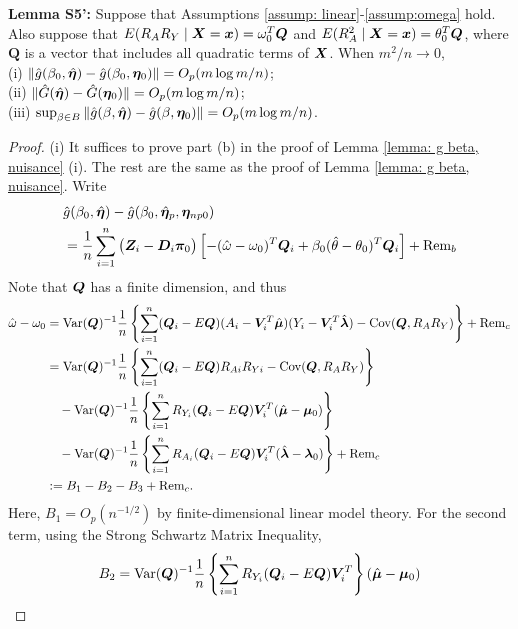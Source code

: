 \documentclass[12pt]{article}
\begin{document}
{{{\bf Lemma S5':}
Suppose that Assumptions \ref{assump: linear}-\ref{assump:omega} hold. Also suppose that  $E(R_A R_Y\mid \bm{X} = \bm x ) = \omega_0^T \bm Q $ and $E(R_A^2 \mid \bm{X} = \bm x ) = \theta_0^T \bm Q $, where $\bm Q$ is a vector that includes all quadratic terms of $\bm{X}$. When $ m^2/n\rightarrow 0 $, \\
(i)  $\|\hat g(\beta_0, \hat{\bm \eta}) -\hat g(\beta_0, \bm \eta_0) \|=O_p(m\log m/n)$;\\
(ii) $\| \hat G(\hat {\bm \eta}) -  \hat G( \bm \eta_0)\|=  O_p(m\log m/n)$;\\
(iii) $\sup_{\beta\in B} \|\hat g(\beta, \hat{\bm \eta}) -\hat g(\beta, \bm \eta_0) \|=  O_p(m\log m/n)$.

\begin{proof}
(i)	It suffices to prove part (b) in the proof of Lemma \ref{lemma: g beta, nuisance} (i). The rest are the same as the proof of Lemma \ref{lemma: g beta, nuisance}. Write
	\begin{align*}
		& \hat g(\beta_0,  \hat {\bm \eta}) - \hat 	g( \beta_0, \hat {\bm \eta}_{p},  \bm \eta_{np0})  \\
		&= \frac{1}{n} \sum_{i=1}^{n}    \big( \bm{Z}_i-\bm D_i \bm\pi_0 \big)  \left[ - (\hat\omega - \omega_0)^T \bm Q_i + \beta_0 (\hat\theta -\theta_0 )^T  \bm Q_i  \right] +\text{Rem}_b
	\end{align*}  
Note that $\bm Q$ has a finite dimension, and thus 
\begin{align*}
	\hat \omega - \omega_0 & = \mbox{Var} (\bm Q)^{-1} \frac1n \left\{\sum_{i=1}^n (\bm Q_i - E \bm Q) (A_i - \bm{V}_i^T \hat{\bm\mu}) (Y_i - \bm{V}_i^T \hat{\bm\lambda}) -  \mbox{Cov} (\bm Q, R_AR_Y ) \right\} + \text{Rem}_c \\
	&= \mbox{Var} (\bm Q)^{-1} \frac1n \left\{\sum_{i=1}^n (\bm Q_i - E \bm Q) R_{Ai} R_{Yi}-  \mbox{Cov} (\bm Q, R_AR_Y ) \right\}  \\
	&\quad - \mbox{Var} (\bm Q)^{-1} \frac1n \left\{\sum_{i=1}^n R_{Y_i} (\bm Q_i - E \bm Q) \bm{V}_i^T (\hat{\bm\mu}- \bm\mu_0) \right\}  \\
	&\quad - \mbox{Var} (\bm Q)^{-1} \frac1n \left\{\sum_{i=1}^n R_{A_i} (\bm Q_i - E \bm Q) \bm{V}_i^T (\hat{\bm\lambda}- \bm\lambda_0) \right\}+    \text{Rem}_c \\
	&:= B_1 - B_2 - B_3 + \text{Rem}_c  .
\end{align*}
Here, $B_1 = O_p(n^{-1/2})$ by finite-dimensional linear model theory. For the second term, using the Strong Schwartz Matrix Inequality, 
\begin{align*}
	B_2 & = \var (\bmQ)^{-1} \frac1n \left\{\sum_{i=1}^n R_{Y_i} (\bm Q_i - E \bmQ) \bmV_i^T  \right\} (\hat{\bm\mu}- \bm\mu_0) \\

\end{align*}
\end{proof}}}
\end{document}

